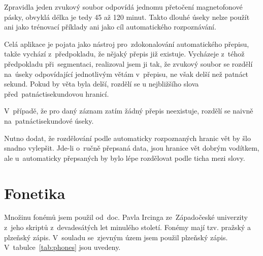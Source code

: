 Zpravidla jeden zvukový soubor odpovídá jednomu přetočení magnetofonové pásky,
obvyklá délka je tedy 45 až 120 minut. Takto dlouhé úseky nelze použít ani jako
trénovací příklady ani jako cíl automatického rozpoznávání.

Celá aplikace je pojata jako nástroj pro~zdokonalování automatického přepisu,
takže vychází z~předpokladu, že nějaký přepis již existuje. Vycházeje z~téhož
předpokladu při~segmentaci, realizoval jsem ji tak, že zvukový soubor se rozdělí
na~úseky odpovídající jednotlivým větám v~přepisu, ne však delší než patnáct
sekund. Pokud by věta byla delší, rozdělí se u nejbližšího slova
před~patnáctisekundovou hranicí.

V~případě, že pro daný záznam zatím žádný přepis neexistuje, rozdělí se naivně
na~patnáctisekundové úseky.

Nutno dodat, že rozdělování podle automaticky rozpoznaných hranic vět by šlo
snadno vylepšit. Jde-li o~ručně přepsaná data, jsou hranice vět dobrým vodítkem,
ale u~automaticky přepsaných by bylo lépe rozdělovat podle ticha mezi slovy.

\section{Fonetika}

Množinu fonémů jsem použil od~doc. Pavla Ircinga ze~Západočeské univerzity
z~jeho skriptů z~devadesátých let minulého století. Fonémy mají tzv. pražský a
plzeňský zápis. V~souladu se~zjevným územ jsem použil plzeňský zápis.
V~tabulce~\ref{tab:phones} jsou uvedeny.

